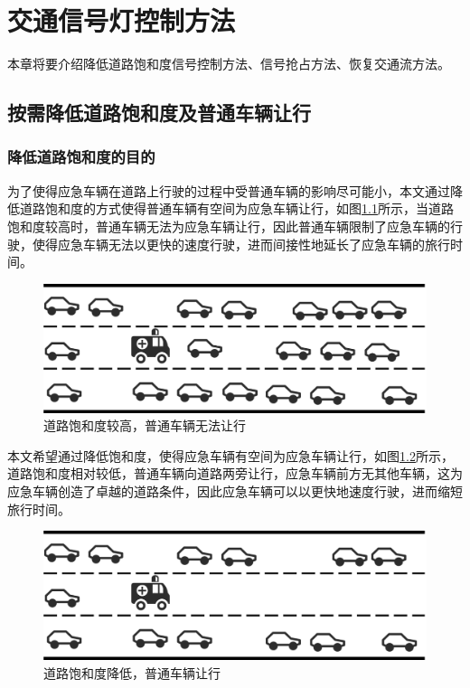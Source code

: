
\chapter{交通信号灯控制方法}
\label{ch4}
本章将要介绍降低道路饱和度信号控制方法、信号抢占方法、恢复交通流方法。




\section{按需降低道路饱和度及普通车辆让行}
\subsection{降低道路饱和度的目的}
为了使得应急车辆在道路上行驶的过程中受普通车辆的影响尽可能小，本文通过降低道路饱和度的方式使得普通车辆有空间为应急车辆让行，如图\ref{fig:highsituration}所示，当道路饱和度较高时，普通车辆无法为应急车辆让行，因此普通车辆限制了应急车辆的行驶，使得应急车辆无法以更快的速度行驶，进而间接性地延长了应急车辆的旅行时间。
\begin{figure}[ht]
	\centering
	\includegraphics[width=\textwidth]{figures/highsituration.png}
	\caption{道路饱和度较高，普通车辆无法让行}
	\label{fig:highsituration}
\end{figure}

本文希望通过降低饱和度，使得应急车辆有空间为应急车辆让行，如图\ref{fig:lowsituration}所示，道路饱和度相对较低，普通车辆向道路两旁让行，应急车辆前方无其他车辆，这为应急车辆创造了卓越的道路条件，因此应急车辆可以以更快地速度行驶，进而缩短旅行时间。

\begin{figure}[ht]
	\centering
	\includegraphics[width=\textwidth]{figures/lowsituration.png}
	\caption{道路饱和度降低，普通车辆让行}
	\label{fig:lowsituration}
\end{figure}

